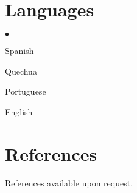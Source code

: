 \documentclass[margin,line,10pt]{res}
\newenvironment{list2}{
  \begin{list}{$\bullet$}{%
      \setlength{\itemsep}{0in}
      \setlength{\parsep}{0in} \setlength{\parskip}{0in}
      \setlength{\topsep}{0in} \setlength{\partopsep}{0in} 
      \setlength{\leftmargin}{0.2in}}}{\end{list}}
\begin{document}
\begin{resume}
\section{\sc Languages} 
\begin{list2}
\vspace{0.3cm}
\item Spanish
\vspace{0.3cm}
\item Quechua
\vspace{0.3cm}
\item Portuguese
\vspace{0.3cm}
\item English
\end{list2}

\section{\sc References}
References available upon request. 

\end{resume}
\end{document}
